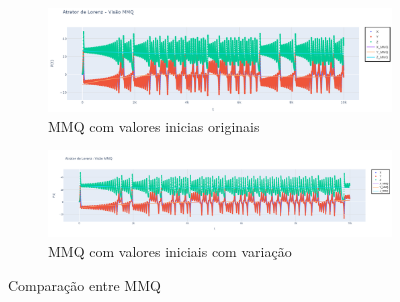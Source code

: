 \documentclass[12pt, a4paper]{article}
\begin{document}
    \begin{figure}[H]
        \centering
        \begin{subfigure}{1.0\textwidth}
            \centering
            \includegraphics[width=\textwidth]{img/mmq.png}
            \caption{MMQ com valores inicias originais}
            \label{fig:mmq-original}
        \end{subfigure}
        \vfill
        \begin{subfigure}{1.0\textwidth}
            \centering
            \includegraphics[width=\textwidth]{img/plotvarmmq.png}
            \caption{MMQ com valores iniciais com variação}
            \label{fig:mmq-var}
        \end{subfigure}
        \caption{Comparação entre MMQ}
        \label{fig:comparacao-mmq}
    \end{figure}
    
\end{document}
